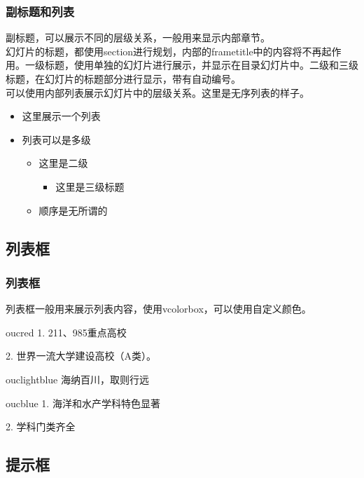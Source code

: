 \documentclass[aspectratio=169,UTF8,t]{beamer}%
\begin{document}
\begin{frame}
    \frametitle{副标题和列表}
    副标题，可以展示不同的层级关系，一般用来显示内部章节。\\
    幻灯片的标题，都使用section进行规划，内部的frametitle中的内容将不再起作用。一级标题，使用单独的幻灯片进行展示，并显示在目录幻灯片中。二级和三级标题，在幻灯片的标题部分进行显示，带有自动编号。\\
    可以使用内部列表展示幻灯片中的层级关系。这里是无序列表的样子。
    \begin{itemize}
        \item 这里展示一个列表 
        \item 列表可以是多级
        \begin{itemize}
            \item 这里是二级
            \begin{itemize}
                \item 这里是三级标题
            \end{itemize}
            \item 顺序是无所谓的
        \end{itemize}
    \end{itemize}
\end{frame}

\subsection{列表框}

\begin{frame}
    \frametitle{列表框}
    列表框一般用来展示列表内容，使用vcolorbox，可以使用自定义颜色。
    \begin{vcolorbox}[中国海洋大学]{oucred}
        1. 211、985重点高校

        2. 世界一流大学建设高校（A类）。
    \end{vcolorbox}
    \begin{vcolorbox}[学校校训]{ouclightblue}
        海纳百川，取则行远
    \end{vcolorbox}
    \begin{vcolorbox}[学校特色]{oucblue}
        1. 海洋和水产学科特色显著
        
        2. 学科门类齐全
    \end{vcolorbox}
\end{frame}

\subsection{提示框}
\end{document}
